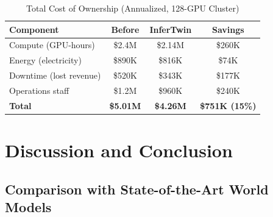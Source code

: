 \documentclass[conference,10pt]{IEEEtran}
\begin{document}
\begin{table}[!htbp]
\caption{Total Cost of Ownership (Annualized, 128-GPU Cluster)}
\label{tab:tco}
\centering\scriptsize
\begin{tabular}{@{}lccc@{}}
\toprule
\textbf{Component} & \textbf{Before} & \textbf{InferTwin} & \textbf{Savings} \\
\midrule
Compute (GPU-hours) & \$2.4M & \$2.14M & \$260K \\
Energy (electricity) & \$890K & \$816K & \$74K \\
Downtime (lost revenue) & \$520K & \$343K & \$177K \\
Operations staff & \$1.2M & \$960K & \$240K \\
\midrule
\textbf{Total} & \textbf{\$5.01M} & \textbf{\$4.26M} & \textbf{\$751K (15\%)} \\
\bottomrule
\end{tabular}
\end{table}

\section{Discussion and Conclusion}
\label{sec:disc}


\subsection{Comparison with State-of-the-Art World Models}

\begin{table}[!htbp]
\caption{InferTwin vs.\ World Model Baselines}
\label{tab:wmcompare}
\centering\scriptsize
{}
\end{table}
\end{document}
